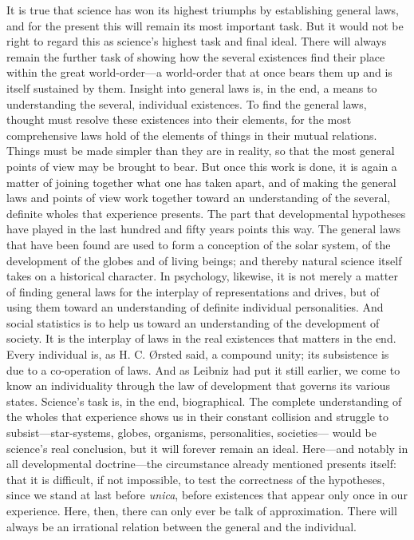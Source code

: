 \documentclass[12pt,a4paper]{article}
\newcommand{\opage}[1]{\marginnote{\footnotesize\textit{[#1]}}}
\begin{document}
It is true that science has won its highest triumphs by establishing general laws,
and for the present this will remain its most important task. But it would not be
right to regard this as science's highest task and final ideal. There will always
remain the further task of showing how the several existences find their place within
the great world-order---a world-order that at once bears them up and is itself
\opage{42}sustained by them. Insight into general laws is, in the end, a means to understanding
the several, individual existences. To find the general laws, thought must resolve
these existences into their elements, for the most comprehensive laws hold of the
elements of things in their mutual relations. Things must be made simpler than they
are in reality, so that the most general points of view may be brought to bear. But
once this work is done, it is again a matter of joining together what one has taken
apart, and of making the general laws and points of view work together toward an
understanding of the several, definite wholes that experience presents. The part that
developmental hypotheses have played in the last hundred and fifty years points this
way. The general laws that have been found are used to form a conception of the solar
system, of the development of the globes and of living beings; and thereby natural
science itself takes on a historical character. In psychology, likewise, it is not
merely a matter of finding general laws for the interplay of representations and
drives, but of using them toward an understanding of definite individual
personalities. And social statistics is to help us toward an understanding of the
development of society. It is the interplay of laws in the real existences that
matters in the end. Every individual is, as H. C. Ørsted said, a compound unity; its
subsistence is due to a co-operation of laws. And as Leibniz had put it still
earlier, we come to know an individuality through the law of development that governs
its various states. Science's task is, in the end, biographical. The complete
understanding of the wholes that experience shows us in their constant collision and
struggle to subsist---star-systems, globes, organisms, personalities, societies---
would be science's real conclusion, but it will forever remain an ideal. Here---and
notably in all developmental doctrine---the circumstance already mentioned presents
itself: that it is difficult, if not impossible, to test the \opage{43}correctness of the
hypotheses, since we stand at last before \textit{unica}, before existences that
appear only once in our experience. Here, then, there can only ever be talk of
approximation. There will always be an irrational relation between the general and
the individual.
\end{document}
